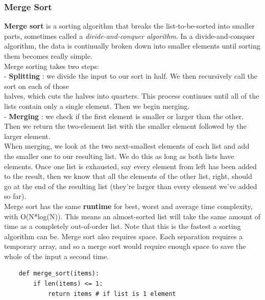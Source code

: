 \documentclass[11pt, a4paper]{article}
\begin{document}
\begin{spacing}{1.1}
	\subsubsection{Merge Sort}
	\textbf{Merge sort} is a sorting algorithm that breaks the list-to-be-sorted into smaller parts, sometimes called a \textit{divide-and-conquer algorithm}. In a divide-and-conquer algorithm, the data is continually broken down into smaller elements until sorting them becomes really simple. \vspace*{1mm} \\
	Merge sorting takes two steps: \\
	\hspace*{3mm} - \textbf{Splitting} : we divide the input to our sort in half. We then recursively call the sort on each of those \\ \hspace*{26mm} halves, which cuts the halves into quarters. This process continues until all of the lists \hspace*{26mm} contain only a single element. Then we begin merging. \\
	\hspace*{3mm} - \textbf{Merging} : we check if the first element is smaller or larger than the other. Then we return the \hspace*{27mm} two-element list with the smaller element followed by the larger element. \vspace*{2mm} \\
	When merging, we look at the two next-smallest elements of each list and add the smaller one to our resulting list. We do this as long as both lists have elements. Once one list is exhausted, say every element from left has been added to the result, then we know that all the elements of the other list, right, should go at the end of the resulting list (they’re larger than every element we’ve added so far). \vspace*{2mm} \\
	Merge sort has the same \textbf{runtime} for best, worst and average time complexity, with O(N*log(N)). This means an almost-sorted list will take the same amount of time as a completely out-of-order list. Note that this is the fastest a sorting algorithm can be. Merge sort also requires space. Each separation requires a temporary array, and so a merge sort would require enough space to save the whole of the input a second time. \newpage

	\begin{lstlisting}
	def merge_sort(items):
		if len(items) <= 1:
			return items # if list is 1 element
		

\end{lstlisting}
\end{spacing}
\end{document}
